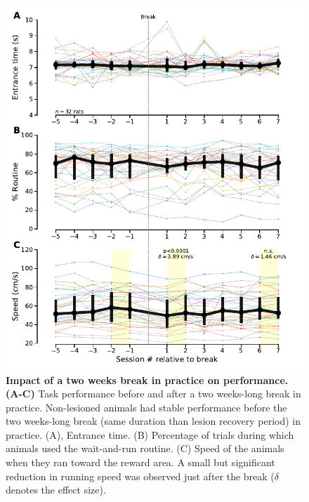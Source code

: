 \begin{figure}[h!]
  \begin{center}
	\includegraphics[scale=1]{ch-appendicies/figures/BreakEffect.pdf}
	\caption
	{\textbf{Impact of a two weeks break in practice on performance.}
	\textbf{(A-C)} Task performance before and after a two weeks-long break in practice. Non-lesioned animals had stable performance before the two weeks-long break (same duration than lesion recovery period) in practice. (A), Entrance time. (B) Percentage of trials during which animals used the wait-and-run routine. (C) Speed of the animals when they ran toward the reward area. A small but significant reduction in running speed was observed just after the break ($\delta$ denotes the effect size).
	}
	\label{fig:appendix:break}
  \end{center}
\end{figure}